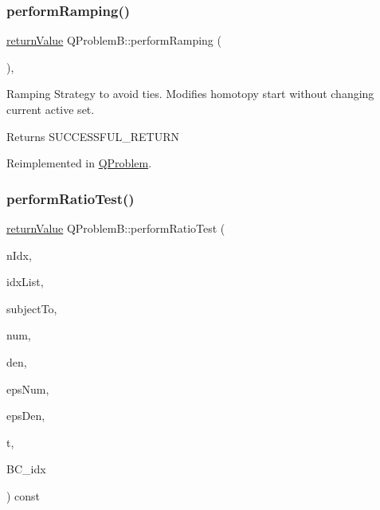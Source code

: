 \subsubsection{\texorpdfstring{perform\+Ramping()}{performRamping()}}
{\footnotesize\ttfamily \hyperlink{_message_handling_8hpp_a81d556f613bfbabd0b1f9488c0fa865e}{return\+Value} Q\+Problem\+B\+::perform\+Ramping (\begin{DoxyParamCaption}{ }\end{DoxyParamCaption})\hspace{0.3cm}{\ttfamily [protected]}, {\ttfamily [virtual]}}

Ramping Strategy to avoid ties. Modifies homotopy start without changing current active set. \begin{DoxyReturn}{Returns}
S\+U\+C\+C\+E\+S\+S\+F\+U\+L\+\_\+\+R\+E\+T\+U\+RN 
\end{DoxyReturn}


Reimplemented in \hyperlink{class_q_problem_a1905b766c096a2dded5927a9e9824b65}{Q\+Problem}.

\mbox{\label{class_q_problem_b_a80ddd094317095df66a192e67273e049}} 
\subsubsection{\texorpdfstring{perform\+Ratio\+Test()}{performRatioTest()}}
{\footnotesize\ttfamily \hyperlink{_message_handling_8hpp_a81d556f613bfbabd0b1f9488c0fa865e}{return\+Value} Q\+Problem\+B\+::perform\+Ratio\+Test (\begin{DoxyParamCaption}\item[{\hyperlink{_types_8hpp_ab6fd6105e64ed14a0c9281326f05e623}{int\+\_\+t}}]{n\+Idx,  }\item[{const \hyperlink{_types_8hpp_ab6fd6105e64ed14a0c9281326f05e623}{int\+\_\+t} $\ast$const}]{idx\+List,  }\item[{const \hyperlink{class_subject_to}{Subject\+To} $\ast$const}]{subject\+To,  }\item[{const \hyperlink{qp_o_a_s_e_s__wrapper_8h_a0d00e2b3dfadee81331bbb39068570c4}{real\+\_\+t} $\ast$const}]{num,  }\item[{const \hyperlink{qp_o_a_s_e_s__wrapper_8h_a0d00e2b3dfadee81331bbb39068570c4}{real\+\_\+t} $\ast$const}]{den,  }\item[{\hyperlink{qp_o_a_s_e_s__wrapper_8h_a0d00e2b3dfadee81331bbb39068570c4}{real\+\_\+t}}]{eps\+Num,  }\item[{\hyperlink{qp_o_a_s_e_s__wrapper_8h_a0d00e2b3dfadee81331bbb39068570c4}{real\+\_\+t}}]{eps\+Den,  }\item[{\hyperlink{qp_o_a_s_e_s__wrapper_8h_a0d00e2b3dfadee81331bbb39068570c4}{real\+\_\+t} \&}]{t,  }\item[{\hyperlink{_types_8hpp_ab6fd6105e64ed14a0c9281326f05e623}{int\+\_\+t} \&}]{B\+C\+\_\+idx }\end{DoxyParamCaption}) const\hspace{0.3cm}{\ttfamily [protected]}}

